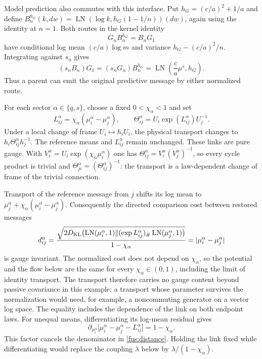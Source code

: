 Model prediction also commutes with this interface. Put
$h_G=(c/a)^2+1/a$ and define
$B_n^{h_G}(k,dw)=\operatorname{LN}(\log k,h_G(1-1/n))(dw)$, again using the
identity at $n=1$. Both routes in the kernel identity
\begin{equation}
 G_nB_n^{h_G}=B_nG_1
 \label{fus:evaluator-square}
\end{equation}
have conditional log mean $(c/a)\log m$ and variance
$h_G-(c/a)^2/n$. Integrating against $s_n$ gives
\begin{equation}
 (s_nB_n)G_1=(s_nG_n)B_n^{h_G}
 =\operatorname{LN}\left(\frac ca\mu^s,h_G\right).
 \label{fus:predictive-square}
\end{equation}
Thus a parent can emit the original predictive message by either normalized
route.

For each sector $\alpha\in\{q,s\}$, choose a fixed $0<\chi_\alpha<1$ and set
\begin{equation}
 L_{ij}^\alpha=\chi_\alpha(\mu_i^\alpha-\mu_j^\alpha),\qquad
 \Theta_{ij}^\alpha=U_i\exp(L_{ij}^\alpha)U_j^{-1}.
 \label{fus:links}
\end{equation}
Under a local change of frame $U_i\mapsto h_iU_i$, the physical transport
changes to $h_i\Theta_{ij}^\alpha h_j^{-1}$. The reference means and
$L_{ij}^\alpha$ remain unchanged. These links are pure gauge. With
$V_i^\alpha=U_i\exp(\chi_\alpha\mu_i^\alpha)$ one has
$\Theta_{ij}^\alpha=V_i^\alpha(V_j^\alpha)^{-1}$, so every cycle product
is trivial and $\Theta_{ji}^\alpha=(\Theta_{ij}^\alpha)^{-1}$: the
transport is a law-dependent change of frame of the trivial connection.

Transport of the reference message from $j$ shifts its log mean to
$\mu_j^\alpha+\chi_\alpha(\mu_i^\alpha-\mu_j^\alpha)$. Consequently the directed
comparison cost between restored messages
\begin{equation}
 d_{ij}^\alpha=
 \frac{\sqrt{2D_{\mathrm{KL}}\bigl(
 \operatorname{LN}(\mu_i^\alpha,1)\|
 (\exp L_{ij}^\alpha)_{\#}\operatorname{LN}(\mu_j^\alpha,1)
 \bigr)}}{1-\chi_\alpha}
 =|\mu_i^\alpha-\mu_j^\alpha|
 \label{fus:distance}
\end{equation}
is gauge invariant. The normalized cost does not depend on $\chi_\alpha$, so
the potential and the flow below are the same for every
$\chi_\alpha\in(0,1)$, including the limit of identity transport. The
transport therefore carries no gauge content beyond passive covariance in
this example; a transport whose parameter survives the normalization would
need, for example, a noncommuting generator on a vector log space. The
equality includes the dependence of the link on both endpoint laws. For
unequal means, differentiating its log-mean residual gives
\begin{equation}
 \partial_{\mu_i^\alpha}
 \bigl[\mu_i^\alpha-\mu_j^\alpha-L_{ij}^\alpha\bigr]=1-\chi_\alpha.
\end{equation}
This factor cancels the denominator in \cref{fus:distance}. Holding the
link fixed while differentiating would replace the coupling $\lambda$
below by $\lambda/(1-\chi_\alpha)$.

